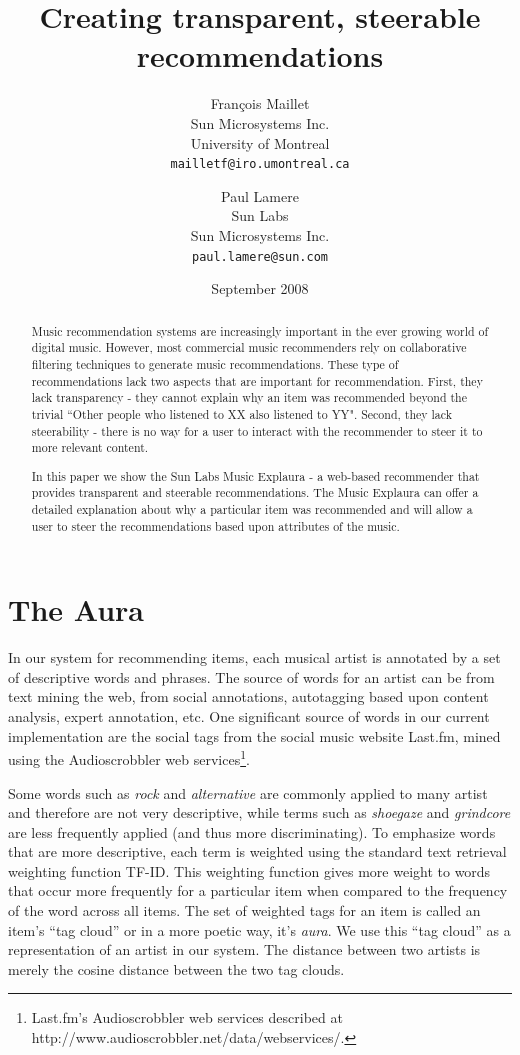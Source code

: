 \documentclass[a4paper,9pt,twocolumn]{article}
\title{Creating transparent, steerable recommendations}
\author{
Fran\c{c}ois Maillet\\
Sun Microsystems Inc.\\
University of Montreal\\
\texttt{mailletf@iro.umontreal.ca}
\and 
Paul Lamere \\
Sun Labs\\
Sun Microsystems Inc.\\
\texttt{paul.lamere@sun.com}
}
\date{September 2008}
\begin{document}
\maketitle

\begin{abstract}

Music recommendation systems are increasingly important in the ever 
    growing world of digital music.  However, most commercial music 
    recommenders rely on collaborative filtering techniques to generate 
    music recommendations. These type of recommendations lack two aspects 
    that are important for recommendation.  First, they lack transparency 
    - they cannot explain why an item was recommended beyond the trivial 
    ``Other people who listened to XX also listened to YY". Second, they 
    lack steerability - there is no way for a user to interact with the 
    recommender to steer it to more relevant content.
    
    In this paper we show the Sun Labs Music Explaura - a 
    web-based recommender that provides transparent and steerable 
    recommendations. The Music Explaura can offer a detailed explanation 
    about why a particular item was recommended and will allow a user to 
    steer the recommendations based upon attributes of the music.

\end{abstract}

\section{The Aura}

In our system for recommending items, each musical artist is annotated
by a set of descriptive words and phrases.  The source
of words for an artist can be from text mining the web, from social
annotations, autotagging based upon content analysis, expert
annotation, etc.  One significant source of words in our current
implementation are the social tags from the social music website
Last.fm, mined using the Audioscrobbler web services\footnote{Last.fm's
Audioscrobbler web services described at
http://www.audioscrobbler.net/data/webservices/.}.

Some words such as \textit{rock} and \textit{alternative} are
commonly applied to many artist and therefore are not very descriptive,
while terms such as \textit{shoegaze} and \textit{grindcore} are
less frequently applied (and thus more discriminating).  To emphasize
words that are more descriptive, each term is weighted using the
standard text retrieval weighting function TF-ID\cite{tfidf}. This
weighting function gives more weight to words that occur more
frequently for a particular item when compared to the frequency of
the word across all items.  The set of weighted tags for an item
is called an item's ``tag cloud'' or in a more poetic way, it's
\textit{aura}.  We use this ``tag cloud'' as a representation of
an artist in our system. The distance between two artists is merely
the cosine distance between the two tag clouds\cite{cosine}.
\end{document}
